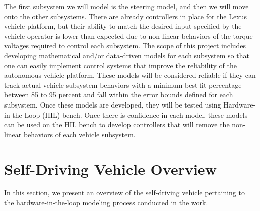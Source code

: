 \documentclass[conference]{IEEEtran}
\begin{document}
The first subsystem we will model is the steering model, and then we will move onto
the other subsystems. There are already controllers in place for the Lexus
vehicle platform, but their ability to match the desired input specified by the vehicle operator
is lower than expected due to non-linear
behaviors of the torque voltages required to control each subsystem. The scope
of this project includes developing mathematical and/or data-driven models for each subsystem so that one can easily implement control systems that improve the reliability of the
autonomous vehicle platform. These models will be considered reliable if they can track actual vehicle subsystem behaviors with a minimum best fit percentage between 85 to 95 percent and fall within the error bounds defined for each subsystem. Once these models are developed, they will be tested using Hardware-in-the-Loop (HIL) bench.
Once there is confidence in each model, these models can be used on the   HIL bench to develop controllers that will remove the non-linear behaviors of each vehicle subsystem.
\section{Self-Driving Vehicle Overview}
\label{sec:selfDrivingVehicleOverview}
In this section, we present an overview of the self-driving vehicle pertaining to the hardware-in-the-loop modeling process conducted in the work.
\end{document}
